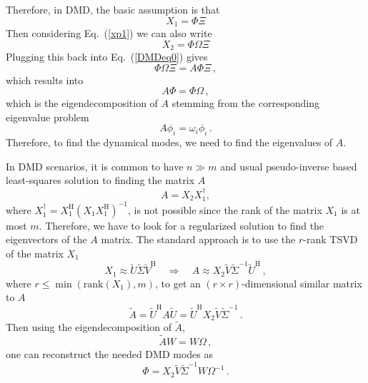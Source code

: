 \documentclass[10pt]{article}
\newcommand{\eq}[1]{Eq.\ (\ref{#1})}
\begin{document}
Therefore, in DMD, the basic assumption is that 
\begin{equation}
    X_1 = \Phi \Xi
\end{equation}
Then considering \eq{xp1} we can also write
\begin{equation}
    X_2 = \Phi \Omega \Xi
\end{equation}
Plugging this back into \eq{DMDeq0} gives
\begin{equation}
    \Phi \Omega \Xi = A \Phi \Xi\,,
\end{equation}
which results into
\begin{equation}
     A \Phi=\Phi \Omega\,,
\end{equation}
which is the eigendecomposition of $A$ stemming from the corresponding eigenvalue problem
\begin{equation}
    A \phi_i = \omega_i \phi_i\,.
\end{equation}
Therefore, to find the dynamical modes, we need to find the eigenvalues of $A$.

In DMD scenarios, it is common to have $n\gg m$ and usual pseudo-inverse based least-squares solution to finding the matrix $A$
\begin{equation}
    A = X_2 X_1^\dag,
\end{equation}
where $X_1^\dag = X_1^\mathrm{H} (X_1 X_1^\mathrm{H})^{-1}$, is not possible since the rank of the matrix $X_1$ is at most $m$.
Therefore, we have to look for a regularized solution to find the eigenvectors of the $A$ matrix.
The standard approach is to use the $r$-rank TSVD of the matrix $X_1$
\begin{equation}
    X_1 \approx \tilde U\tilde \Sigma \tilde V^\mathrm{H}\quad \Rightarrow \quad A \approx X_2  \tilde V \tilde \Sigma^{-1}\tilde U^\mathrm{H}\,,
\end{equation}
where $r\le \min\left(\mathrm{rank}(X_1),m\right)$, to get an $(r\times r)$-dimensional similar matrix to $A$
\begin{equation}
    \tilde A = \tilde U^\mathrm{H} A \tilde U = \tilde U^\mathrm{H} X_2  \tilde V \tilde \Sigma^{-1} \,.
\end{equation}
Then using the eigendecomposition of $\tilde A$,
\begin{equation}
    \tilde A W = W \Omega\,,
\end{equation}
one can reconstruct the needed DMD modes as
\begin{equation}
    \Phi = X_2 \tilde V \tilde \Sigma^{-1} W \Omega^{-1}\,.
\end{equation}
\end{document}
